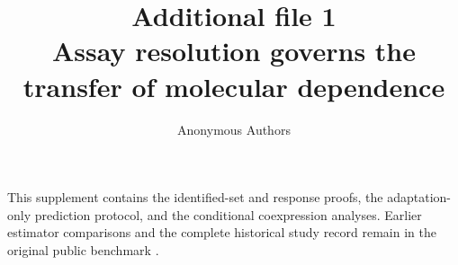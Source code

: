 \documentclass[10pt,a4paper]{article}
\title{Additional file 1\\[4pt]\large Assay resolution governs the transfer of molecular dependence}
\author{Anonymous Authors}
\date{}
\begin{document}
\maketitle
This supplement contains the identified-set and response proofs, the
adaptation-only prediction protocol, and the conditional coexpression
analyses. Earlier estimator comparisons and the complete historical study
record remain in the original public benchmark \cite{benchmark2026}.



\end{document}
